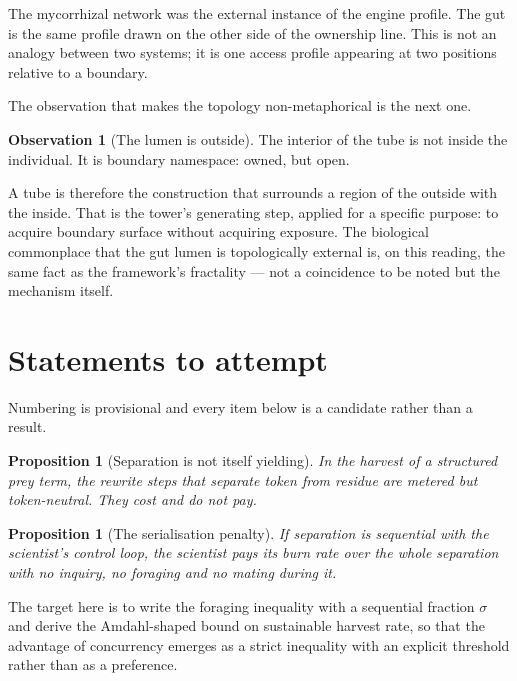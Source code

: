 \documentclass[11pt]{article}
\theoremstyle{plain}
\newtheorem{proposition}[theorem]{Proposition}
\theoremstyle{definition}
\newtheorem{observation}[theorem]{Observation}
\begin{document}
The mycorrhizal network was the external instance of the engine profile. The gut is the same profile
drawn on the other side of the ownership line. This is not an analogy between two systems; it is one
access profile appearing at two positions relative to a boundary.

The observation that makes the topology non-metaphorical is the next one.

\begin{observation}[The lumen is outside]
\label{obs:lumen}
The interior of the tube is not inside the individual. It is boundary namespace: owned, but open.
\end{observation}

A tube is therefore the construction that surrounds a region of the outside with the inside. That is
the tower's generating step, applied for a specific purpose: to acquire boundary surface without
acquiring exposure. The biological commonplace that the gut lumen is topologically external is, on
this reading, the same fact as the framework's fractality --- not a coincidence to be noted but the
mechanism itself.

\section{Statements to attempt}
\label{sec:props}

Numbering is provisional and every item below is a candidate rather than a result.

\begin{proposition}[Separation is not itself yielding]
\label{prop:A}
In the harvest of a structured prey term, the rewrite steps that separate token from residue are
metered but token-neutral. They cost and do not pay.
\end{proposition}

\begin{proposition}[The serialisation penalty]
\label{prop:B}
If separation is sequential with the scientist's control loop, the scientist pays its burn rate over
the whole separation with no inquiry, no foraging and no mating during it.
\end{proposition}

The target here is to write the foraging inequality with a sequential fraction $\sigma$ and derive the
Amdahl-shaped bound on sustainable harvest rate, so that the advantage of concurrency emerges as a
strict inequality with an explicit threshold rather than as a preference.
\end{document}
